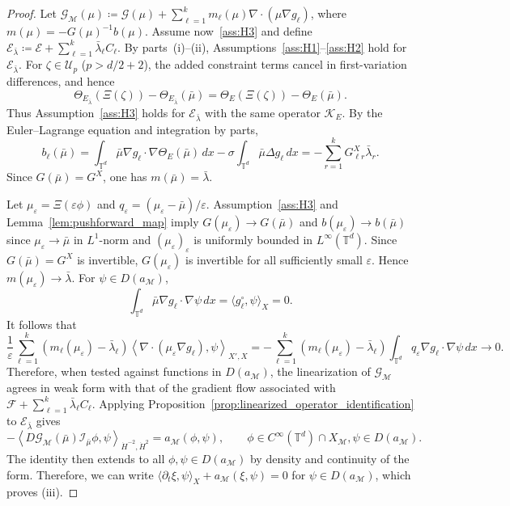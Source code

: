 \documentclass[10pt,a4paper]{amsart}
\newcommand{\E}{\mathcal{E}}
\newcommand{\F}{\mathcal{F}}
\newcommand{\T}{\mathbb{T}}
\newcommand{\dotHk}[1][k]{\dot{H}^{#1}}
\newcommand{\rieszmap}[1][\mu]{\mathcal{I}_{#1}}
\begin{document}
\begin{proof}
    Let $\mathcal{G}_{\mathcal{M}}(\mu) \coloneqq \mathcal{G}(\mu) + \sum_{\ell=1}^k m_\ell(\mu)\nabla\cdot(\mu\nabla g_\ell)$, where $m(\mu) = -G(\mu)^{-1}b(\mu)$.
    Assume now~\ref{ass:H3} and define $\E_{\bar\lambda} \coloneqq \E + \sum_{\ell=1}^k \bar\lambda_\ell C_\ell$.
    By parts~(i)--(ii), Assumptions~\ref{ass:H1}--\ref{ass:H2} hold for $\E_{\bar\lambda}$.
    For $\zeta \in \mathcal{U}_p$ ($p > d/2 + 2$), the added constraint terms cancel in first-variation differences, and hence
    \[
    \Theta_{E_{\bar\lambda}}(\Xi(\zeta)) - \Theta_{E_{\bar\lambda}}(\bar\mu) = \Theta_E(\Xi(\zeta)) - \Theta_E(\bar\mu).
    \]
    Thus Assumption~\ref{ass:H3} holds for $\E_{\bar\lambda}$ with the same operator $\mathcal{K}_E$.
    By the Euler--Lagrange equation and integration by parts,
    \[
    b_\ell(\bar\mu) = \int_{\T^d} \bar\mu \nabla g_\ell \cdot \nabla\Theta_E(\bar\mu) \, dx - \sigma\int_{\T^d} \bar\mu \Delta g_\ell \, dx = -\sum_{r=1}^k G^X_{\ell r} \bar\lambda_r.
    \]
    Since $G(\bar\mu) = G^X$, one has $m(\bar\mu) = \bar\lambda$.

    Let $\mu_\varepsilon = \Xi(\varepsilon\phi)$ and $q_\varepsilon = (\mu_\varepsilon - \bar\mu)/\varepsilon$. 
    Assumption~\ref{ass:H3} and Lemma~\ref{lem:pushforward_map} imply $G(\mu_\varepsilon) \to G(\bar\mu)$ and $b(\mu_\varepsilon) \to b(\bar\mu)$ since $\mu_{\varepsilon} \to \bar\mu$ in $L^1$-norm and $(\mu_\varepsilon)_{\varepsilon}$ is uniformly bounded in $L^{\infty}(\T^d)$.
    Since $G(\bar\mu) = G^X$ is invertible, $G(\mu_\varepsilon)$ is invertible for all sufficiently small $\varepsilon$.
    Hence $m(\mu_\varepsilon) \to \bar\lambda$.
    For $\psi \in D(a_{\mathcal{M}})$,
    \[
    \int_{\T^d} \bar\mu \nabla g_\ell \cdot \nabla\psi \, dx = \langle g_\ell^\circ,\psi\rangle_X = 0.
    \]
    It follows that
    \[
    \frac{1}{\varepsilon} \sum_{\ell=1}^k (m_\ell(\mu_\varepsilon) - \bar\lambda_\ell) \left\langle \nabla \cdot (\mu_\varepsilon \nabla g_\ell), \psi \right\rangle_{X',X} = -\sum_{\ell=1}^k (m_\ell(\mu_\varepsilon) - \bar\lambda_\ell) \int_{\T^d}q_\varepsilon \nabla g_\ell \cdot \nabla\psi\,dx \to 0.
    \]
    Therefore, when tested against functions in $D(a_{\mathcal{M}})$, the linearization of $\mathcal{G}_{\mathcal{M}}$ agrees in weak form with that of the gradient flow associated with $\F + \sum_{\ell=1}^k \bar\lambda_\ell C_\ell$.
    Applying Proposition~\ref{prop:linearized_operator_identification} to $\E_{\bar\lambda}$ gives
    \[
    -\left\langle D\mathcal{G}_{\mathcal{M}}(\bar\mu) \rieszmap[\bar\mu]\phi, \psi \right\rangle_{\dot{H}^{-2}, \dotHk[2]} = a_{\mathcal{M}}(\phi, \psi), \qquad \phi \in C^\infty(\T^d) \cap X_{\mathcal{M}}, \psi \in D(a_{\mathcal{M}}).
    \]
    The identity then extends to all $\phi, \psi \in D(a_{\mathcal{M}})$ by density and continuity of the form.
    Therefore, we can write $\langle \partial_t\xi, \psi\rangle_X + a_{\mathcal{M}}(\xi, \psi) = 0$ for $\psi \in D(a_{\mathcal{M}})$, which proves (iii).
\end{proof}
\end{document}
